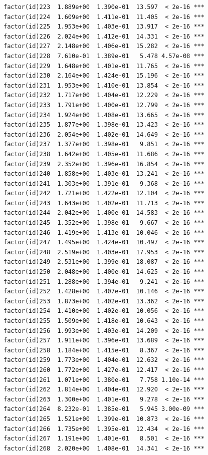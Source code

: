 \documentclass[]{book}
\begin{document}
\begin{verbatim}
factor(id)223  1.889e+00  1.390e-01  13.597  < 2e-16 ***
factor(id)224  1.609e+00  1.411e-01  11.405  < 2e-16 ***
factor(id)225  1.953e+00  1.403e-01  13.917  < 2e-16 ***
factor(id)226  2.024e+00  1.412e-01  14.331  < 2e-16 ***
factor(id)227  2.148e+00  1.406e-01  15.282  < 2e-16 ***
factor(id)228  7.610e-01  1.389e-01   5.478 4.57e-08 ***
factor(id)229  1.648e+00  1.401e-01  11.765  < 2e-16 ***
factor(id)230  2.164e+00  1.424e-01  15.196  < 2e-16 ***
factor(id)231  1.953e+00  1.410e-01  13.854  < 2e-16 ***
factor(id)232  1.717e+00  1.404e-01  12.229  < 2e-16 ***
factor(id)233  1.791e+00  1.400e-01  12.799  < 2e-16 ***
factor(id)234  1.924e+00  1.408e-01  13.665  < 2e-16 ***
factor(id)235  1.877e+00  1.398e-01  13.423  < 2e-16 ***
factor(id)236  2.054e+00  1.402e-01  14.649  < 2e-16 ***
factor(id)237  1.377e+00  1.398e-01   9.851  < 2e-16 ***
factor(id)238  1.642e+00  1.405e-01  11.686  < 2e-16 ***
factor(id)239  2.352e+00  1.396e-01  16.854  < 2e-16 ***
factor(id)240  1.858e+00  1.403e-01  13.241  < 2e-16 ***
factor(id)241  1.303e+00  1.391e-01   9.368  < 2e-16 ***
factor(id)242  1.721e+00  1.422e-01  12.104  < 2e-16 ***
factor(id)243  1.643e+00  1.402e-01  11.713  < 2e-16 ***
factor(id)244  2.042e+00  1.400e-01  14.583  < 2e-16 ***
factor(id)245  1.352e+00  1.398e-01   9.667  < 2e-16 ***
factor(id)246  1.419e+00  1.413e-01  10.046  < 2e-16 ***
factor(id)247  1.495e+00  1.424e-01  10.497  < 2e-16 ***
factor(id)248  2.519e+00  1.403e-01  17.953  < 2e-16 ***
factor(id)249  2.531e+00  1.399e-01  18.087  < 2e-16 ***
factor(id)250  2.048e+00  1.400e-01  14.625  < 2e-16 ***
factor(id)251  1.288e+00  1.394e-01   9.241  < 2e-16 ***
factor(id)252  1.428e+00  1.407e-01  10.146  < 2e-16 ***
factor(id)253  1.873e+00  1.402e-01  13.362  < 2e-16 ***
factor(id)254  1.410e+00  1.402e-01  10.056  < 2e-16 ***
factor(id)255  1.509e+00  1.418e-01  10.643  < 2e-16 ***
factor(id)256  1.993e+00  1.403e-01  14.209  < 2e-16 ***
factor(id)257  1.911e+00  1.396e-01  13.689  < 2e-16 ***
factor(id)258  1.184e+00  1.415e-01   8.367  < 2e-16 ***
factor(id)259  1.773e+00  1.404e-01  12.632  < 2e-16 ***
factor(id)260  1.772e+00  1.427e-01  12.417  < 2e-16 ***
factor(id)261  1.071e+00  1.380e-01   7.758 1.10e-14 ***
factor(id)262  1.814e+00  1.404e-01  12.920  < 2e-16 ***
factor(id)263  1.300e+00  1.401e-01   9.278  < 2e-16 ***
factor(id)264  8.232e-01  1.385e-01   5.945 3.00e-09 ***
factor(id)265  1.521e+00  1.399e-01  10.873  < 2e-16 ***
factor(id)266  1.735e+00  1.395e-01  12.434  < 2e-16 ***
factor(id)267  1.191e+00  1.401e-01   8.501  < 2e-16 ***
factor(id)268  2.020e+00  1.408e-01  14.341  < 2e-16 ***

\end{verbatim}
\end{document}
